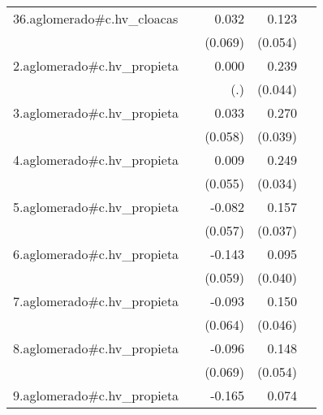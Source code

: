 {\begin{longtable}{l*{4}{D{.}{.}{-1}}}
\addlinespace
36.aglomerado#c.hv\_cloacas&                     &       0.032         &       0.123\sym{*}  &                     \\
            &                     &     (0.069)         &     (0.054)         &                     \\
\addlinespace
2.aglomerado#c.hv\_propieta&                     &       0.000         &       0.239\sym{***}&                     \\
            &                     &         (.)         &     (0.044)         &                     \\
\addlinespace
3.aglomerado#c.hv\_propieta&                     &       0.033         &       0.270\sym{***}&                     \\
            &                     &     (0.058)         &     (0.039)         &                     \\
\addlinespace
4.aglomerado#c.hv\_propieta&                     &       0.009         &       0.249\sym{***}&                     \\
            &                     &     (0.055)         &     (0.034)         &                     \\
\addlinespace
5.aglomerado#c.hv\_propieta&                     &      -0.082         &       0.157\sym{***}&                     \\
            &                     &     (0.057)         &     (0.037)         &                     \\
\addlinespace
6.aglomerado#c.hv\_propieta&                     &      -0.143\sym{*}  &       0.095\sym{*}  &                     \\
            &                     &     (0.059)         &     (0.040)         &                     \\
\addlinespace
7.aglomerado#c.hv\_propieta&                     &      -0.093         &       0.150\sym{**} &                     \\
            &                     &     (0.064)         &     (0.046)         &                     \\
\addlinespace
8.aglomerado#c.hv\_propieta&                     &      -0.096         &       0.148\sym{**} &                     \\
            &                     &     (0.069)         &     (0.054)         &                     \\
\addlinespace
9.aglomerado#c.hv\_propieta&                     &      -0.165\sym{**} &       0.074         &                     \\

\end{longtable}}
